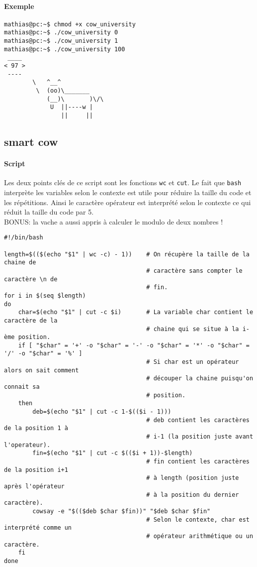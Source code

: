 \documentclass[french, 10pt, a4paper]{article}
\begin{document}
\paragraph{Exemple}
\begin{verbatim}
mathias@pc:~$ chmod +x cow_university
mathias@pc:~$ ./cow_university 0
mathias@pc:~$ ./cow_university 1
mathias@pc:~$ ./cow_university 100
 ____
< 97 >
 ----
		\   ^__^
		 \  (oo)\_______
			(__)\       )\/\
			 U  ||----w |
				||     ||
\end{verbatim}



\subsection{smart cow}

\paragraph{Script}
Les deux points clés de ce script sont les fonctions \texttt{wc} et \texttt{cut}. Le fait que \texttt{bash} interprète les variables selon le contexte est utile pour réduire la taille du code et les répétitions. Ainsi le caractère opérateur est interprété selon le contexte ce qui réduit la taille du code par 5.\\
BONUS: la vache a aussi appris à calculer le modulo de deux nombres !
\begin{verbatim}
#!/bin/bash

length=$(($(echo "$1" | wc -c) - 1))    # On récupère la taille de la chaine de 
										# caractère sans compter le caractère \n de 
										# fin.
for i in $(seq $length)
do
	char=$(echo "$1" | cut -c $i)       # La variable char contient le caractère de la 
										# chaine qui se situe à la i-ème position.
	if [ "$char" = '+' -o "$char" = '-' -o "$char" = '*' -o "$char" = '/' -o "$char" = '%' ]
										# Si char est un opérateur alors on sait comment 
										# découper la chaine puisqu'on connait sa 
										# position.
	then
		deb=$(echo "$1" | cut -c 1-$(($i - 1)))
										# deb contient les caractères de la position 1 à 
										# i-1 (la position juste avant l'operateur).
		fin=$(echo "$1" | cut -c $(($i + 1))-$length)
										# fin contient les caractères de la position i+1 
										# à length (position juste après l'opérateur 
										# à la position du dernier caractère).
		cowsay -e "$(($deb $char $fin))" "$deb $char $fin"
										# Selon le contexte, char est interprété comme un 
										# opérateur arithmétique ou un caractère.
	fi
done
\end{verbatim}
\end{document}
